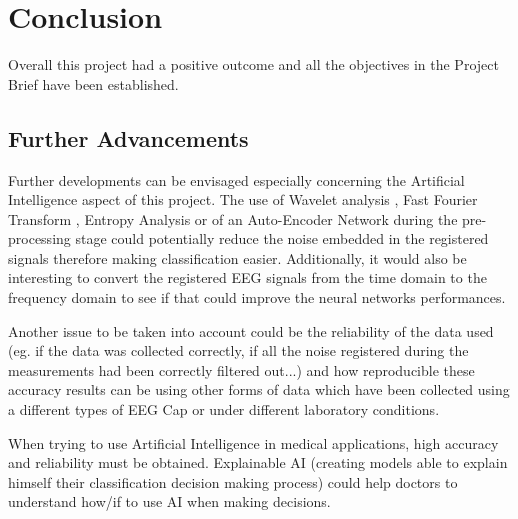 \chapter{Conclusion}

\label{ch:planwork}
\setlength\lineskip{0pt}
\vspace*{15pt}

Overall this project had a positive outcome and all the objectives in the Project Brief have been established.

\section{Further Advancements}

Further developments can be envisaged especially concerning the Artificial Intelligence aspect of this project. The use of Wavelet analysis \cite{wavelet}, Fast Fourier Transform \cite{fft}, Entropy Analysis \cite{entrophy} or of an Auto-Encoder Network \cite{autoencoder} during the pre-processing stage could potentially reduce the noise embedded in the registered signals therefore making classification easier. Additionally, it would also be interesting to convert the registered EEG signals from the time domain to the frequency domain to see if that could improve the neural networks performances.

Another issue to be taken into account could be the reliability of the data used (eg. if the data was collected correctly, if all the noise registered during the measurements had been correctly filtered out...) and how reproducible these accuracy results can be using other forms of data which have been collected using a different types of EEG Cap or under different laboratory conditions.

When trying to use Artificial Intelligence in medical applications, high accuracy and reliability must be obtained. Explainable AI (creating models able to explain himself their classification decision making process) could help doctors to understand how/if to use AI when making decisions.